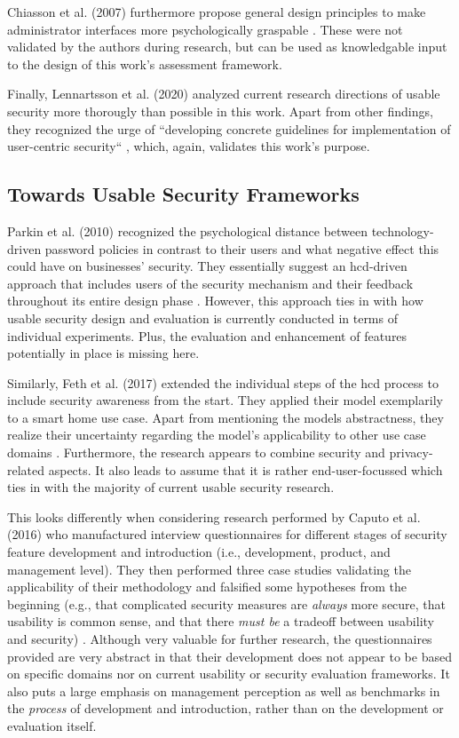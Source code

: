 Chiasson et al. (2007) furthermore propose general design principles to make administrator interfaces more psychologically graspable \cite{chiasson_even_2007}. These were not validated by the authors during research, but can be used as knowledgable input to the design of this work's assessment framework.

Finally, Lennartsson et al. (2020) analyzed current research directions of usable security more thorougly than possible in this work. Apart from other findings, they recognized the urge of ``developing concrete guidelines for implementation of user-centric security`` \cite{lennartsson_exploring_2020}, which, again, validates this work's purpose.

\subsection{Towards Usable Security Frameworks}
Parkin et al. (2010) recognized the psychological distance between technology-driven password policies in contrast to their users and what negative effect this could have on businesses' security. They essentially suggest an \ac{hcd}-driven approach that includes users of the security mechanism and their feedback throughout its entire design phase \cite{parkin_stealth_2010}. However, this approach ties in with how usable security design and evaluation is currently conducted in terms of individual experiments. Plus, the evaluation and enhancement of features potentially in place is missing here.

Similarly, Feth et al. (2017) extended the individual steps of the \ac{hcd} process to include security awareness from the start. They applied their model exemplarily to a smart home use case. Apart from mentioning the models abstractness, they realize their uncertainty regarding the model's applicability to other use case domains \cite{feth_user-centered_2017}. Furthermore, the research appears to combine security and privacy-related aspects. It also leads to assume that it is rather end-user-focussed which ties in with the majority of current usable security research.

This looks differently when considering research performed by Caputo et al. (2016) who manufactured interview questionnaires for different stages of security feature development and introduction (i.e., development, product, and management level). They then performed three case studies validating the applicability of their methodology and falsified some hypotheses from the beginning (e.g., that complicated security measures are \textit{always} more secure, that usability is common sense, and that there \textit{must be} a tradeoff between usability and security) \cite{caputo_barriers_2016}. Although very valuable for further research, the questionnaires provided are very abstract in that their development does not appear to be based on specific domains nor on current usability or security evaluation frameworks. It also puts a large emphasis on management perception as well as benchmarks in the \textit{process} of development and introduction, rather than on the development or evaluation itself.

